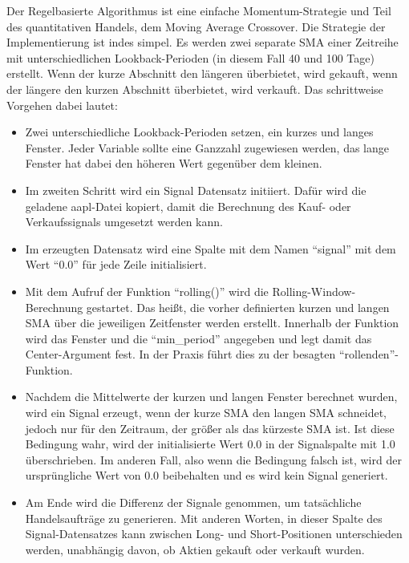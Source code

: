 Der Regelbasierte Algorithmus ist eine einfache Momentum-Strategie und Teil des quantitativen Handels, dem Moving Average Crossover. \cite{willems_2019} Die Strategie der Implementierung ist indes simpel. Es werden zwei separate \ac{SMA} einer Zeitreihe mit unterschiedlichen Lookback-Perioden (in diesem Fall 40 und 100 Tage) erstellt. \cite{willems_2019} Wenn der kurze Abschnitt den längeren überbietet, wird gekauft, wenn der längere den kurzen Abschnitt überbietet, wird verkauft. \cite{willems_2019} Das schrittweise Vorgehen dabei lautet: \cite{willems_2019}
\begin{itemize}
	\item Zwei unterschiedliche Lookback-Perioden setzen, ein kurzes und langes Fenster. Jeder Variable sollte eine Ganzzahl zugewiesen werden, das lange Fenster hat dabei den höheren Wert gegenüber dem kleinen.
	
	\item Im zweiten Schritt wird ein Signal Datensatz initiiert. Dafür wird die geladene aapl-Datei kopiert, damit die Berechnung des Kauf- oder Verkaufssignals umgesetzt werden kann.
	
	\item Im erzeugten Datensatz wird eine Spalte mit dem Namen \enquote{signal} mit dem Wert \enquote{0.0} für jede Zeile initialisiert.

	\item Mit dem Aufruf der Funktion \enquote{rolling()} wird die Rolling-Window-Berechnung gestartet. Das heißt, die vorher definierten kurzen und langen \ac{SMA} über die jeweiligen Zeitfenster  werden erstellt. Innerhalb der Funktion wird das Fenster und die \enquote{min\_period} angegeben und legt damit das Center-Argument fest. In der Praxis führt dies zu der besagten \enquote{rollenden}-Funktion.
	
	\item Nachdem die Mittelwerte der kurzen und langen Fenster berechnet wurden, wird ein Signal erzeugt, wenn der kurze \ac{SMA} den langen \ac{SMA} schneidet, jedoch nur für den Zeitraum, der größer als das kürzeste \ac{SMA} ist. Ist diese Bedingung wahr, wird der initialisierte Wert 0.0 in der Signalspalte mit 1.0 überschrieben. Im anderen Fall, also wenn die Bedingung falsch ist, wird der ursprüngliche Wert von 0.0 beibehalten und es wird kein Signal generiert. 

	\item Am Ende wird die Differenz der Signale genommen, um tatsächliche Handelsaufträge zu generieren. Mit anderen Worten, in dieser Spalte des Signal-Datensatzes kann zwischen Long- und Short-Positionen unterschieden werden, unabhängig davon, ob Aktien gekauft oder verkauft wurden.
\end{itemize}



